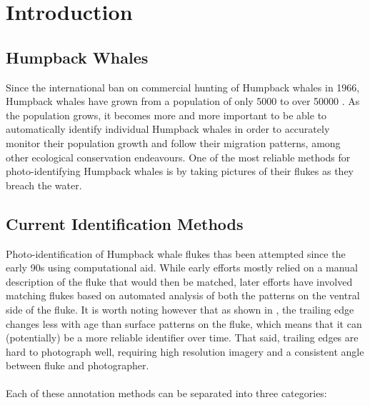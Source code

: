  
\chapter{Introduction} \label{sec:introduction}
 
\section{Humpback Whales}

Since the international ban on commercial hunting of Humpback whales in 1966, Humpback whales have grown from a population of only 5000 \cite{baker1993abundant} to over 50000 \cite{branch2011humpback}. 
As the population grows, it becomes more and more important to be able to automatically identify individual Humpback whales in order to accurately monitor their population growth and follow their migration patterns, among other ecological conservation endeavours.
One of the most reliable methods for photo-identifying Humpback whales is by taking pictures of their flukes as they breach the water.

\section{Current Identification Methods}


Photo-identification of Humpback whale flukes thas been attempted since the early 90s \cite{mizroch1990computer} using computational aid.
While early efforts mostly relied on a manual description of the fluke that would then be matched, later efforts have involved matching flukes based on automated analysis of both the patterns on the ventral side of the fluke.
It is worth noting however that as shown in \cite{blackmer2000temporal}, the trailing edge changes less with age than surface patterns on the fluke, which means that it can (potentially) be a more reliable identifier over time.
That said, trailing edges are hard to photograph well, requiring high resolution imagery and a consistent angle between fluke and photographer.
\\\\
Each of these annotation methods can be separated into three categories:


